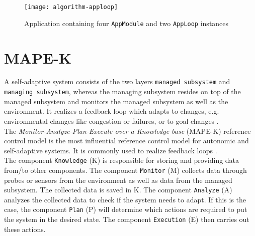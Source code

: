 \begin{figure}[htb]
    \centering
    \texttt{[image: algorithm-apploop]}
    \caption{Application containing four \texttt{AppModule} and two \texttt{AppLoop} instances}
    \label{fig:apploop}
\end{figure}

\section{MAPE-K}
A self-adaptive system consists of the two layers \texttt{managed subsystem} and \texttt{managing subsystem}, whereas the managing subsystem resides on top of the managed subsystem and monitors the managed subsystem as well as the environment. It realizes a feedback loop which adapts to changes, e.g. environmental changes like congestion or failures, or to goal changes \cite{mape-k}.\\

The \textit{Monitor-Analyze-Plan-Execute over a Knowledge base} (MAPE-K) \cite{autonomic-computing} reference control model is the most influential reference control model for autonomic and self-adaptive systems. It is commonly used to realize feedback loops \cite{mape-k}.\\

The component \texttt{Knowledge} (K) is responsible for storing and providing data from/to other components. The component \texttt{Monitor} (M) collects data through probes or sensors from the environment as well as data from the managed subsystem. The collected data is saved in K. The component \texttt{Analyze} (A) analyzes the collected data to check if the system needs to adapt. If this is the case, the component \texttt{Plan} (P) will determine which actions are required to put the system in the desired state. The component \texttt{Execution} (E) then carries out these actions. \cite{mape-k}  